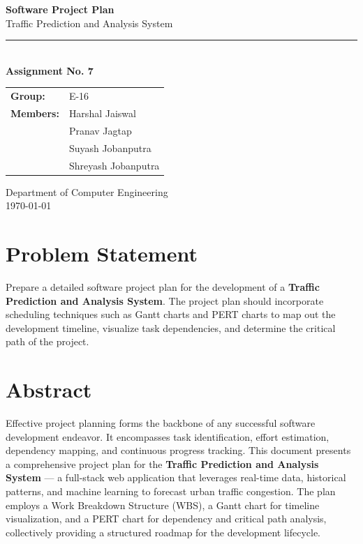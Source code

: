\documentclass[12pt,a4paper]{article}
\begin{document}
\begin{titlepage}
\centering
\vspace*{2cm}
{\Huge\bfseries\color{headblue} Software Project Plan\\[12pt]}
{\LARGE Traffic Prediction and Analysis System\\[20pt]}
\rule{0.6\textwidth}{1pt}\\[20pt]

{\large\textbf{Assignment No. 7}}\\[30pt]

\begin{tabular}{ll}
\textbf{Group:} & E-16 \\[4pt]
\textbf{Members:} & Harshal Jaiswal \\
 & Pranav Jagtap \\
 & Suyash Jobanputra \\
 & Shreyash Jobanputra \\
\end{tabular}

\vfill
{\small Department of Computer Engineering\\
\today}
\end{titlepage}

\section{Problem Statement}
Prepare a detailed software project plan for the development of a \textbf{Traffic Prediction and Analysis System}. The project plan should incorporate scheduling techniques such as Gantt charts and PERT charts to map out the development timeline, visualize task dependencies, and determine the critical path of the project.

\section{Abstract}
Effective project planning forms the backbone of any successful software development endeavor. It encompasses task identification, effort estimation, dependency mapping, and continuous progress tracking. This document presents a comprehensive project plan for the \textbf{Traffic Prediction and Analysis System} --- a full-stack web application that leverages real-time data, historical patterns, and machine learning to forecast urban traffic congestion. The plan employs a Work Breakdown Structure (WBS), a Gantt chart for timeline visualization, and a PERT chart for dependency and critical path analysis, collectively providing a structured roadmap for the development lifecycle.
\end{document}
